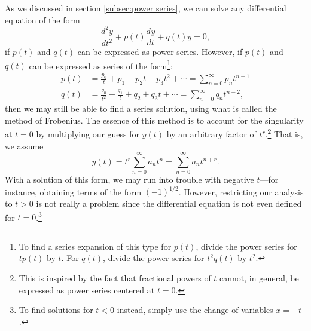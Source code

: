 \documentclass{myart}
\newcommand{\deriv}[3][]{\frac{d^{#1}#2}{d#3^{#1}}}
\begin{document}
As we discussed in section \ref{subsec:power series}, we can solve any differential equation of the form
\begin{equation} \label{eq:frobenius homogeneous}
\deriv[2]{y}{t} + p(t) \deriv{y}{t} + q(t) y = 0,
\end{equation}
if $p(t)$ and $q(t)$ can be expressed as power series. However, if $p(t)$ and $q(t)$ can be expressed as series of the form\footnote{To find a series expansion of this type for $p(t)$, divide the power series for $tp(t)$ by $t$. For $q(t)$, divide the power series for $t^2q(t)$ by $t^2$.}:
\begin{align*}
p(t) &= \frac{p_0}{t} + p_1 + p_2t + p_3t^2 + \cdots = \sum_{n=0}^\infty p_n t^{n-1} \\
q(t) &= \frac{q_0}{t^2} + \frac{q_1}{t} + q_2 + q_3t + \cdots = \sum_{n=0}^\infty q_n t^{n-2},
\end{align*}
then we may still be able to find a series solution, using what is called the method of Frobenius. The essence of this method is to account for the singularity at $t = 0$ by multiplying our guess for $y(t)$ by an arbitrary factor of $t^r$.\footnote{This is inspired by the fact that fractional powers of $t$ cannot, in general, be expressed as power series centered at $t = 0$.} That is, we assume
\begin{equation*}
y(t) = t^r \sum_{n=0}^\infty a_n t^n = \sum_{n=0}^\infty a_n t^{n + r}.
\end{equation*}
With a solution of this form, we may run into trouble with negative $t$---for instance, obtaining terms of the form $(-1)^{1/2}$. However, restricting our analysis to $t > 0$ is not really a problem since the differential equation is not even defined for $t = 0$.\footnote{To find solutions for $t < 0$ instead, simply use the change of variables $x = -t$.}
\end{document}
